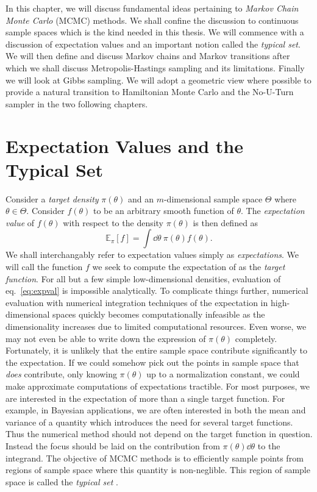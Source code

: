 In this chapter, we will discuss fundamental ideas pertaining to \textit{Markov Chain Monte Carlo} (MCMC) methods.
We shall confine the discussion to continuous sample spaces which is the kind needed in this thesis.
We will commence with a discussion of expectation values and an important notion called the \textit{typical set}. 
We will then define and discuss Markov chains and Markov transitions after which we shall
discuss Metropolis-Hastings sampling and its limitations. Finally we will
look at Gibbs sampling.
We will adopt a geometric view where possible to provide a natural transition to Hamiltonian Monte Carlo and the No-U-Turn sampler
in the two following chapters. 

\section{Expectation Values and the Typical Set}
Consider a \textit{target density} $\pi(\theta)$ and an $m$-dimensional sample space $\Theta$ where $\theta \in \Theta$. 
Consider $f(\theta)$ to be an arbitrary smooth
function of $\theta$. The \textit{expectation value} of $f(\theta)$ with respect to the density $\pi(\theta)$ is then defined as
\begin{equation}\label{eq:expval}
    \mathbb{E}_\pi[f] = \int \dd \theta \ \pi(\theta)f(\theta).
\end{equation}
We shall interchangably refer to expectation values simply as \textit{expectations}.
We will call the function $f$ we seek to compute the expectation of as the \textit{target function}.
For all but a few simple low-dimensional densities, evaluation of eq.~\eqref{eq:expval} is impossible analytically. 
To complicate things further, numerical evaluation with numerical integration techniques of the expectation in high-dimensional spaces quickly becomes computationally
infeasible as the dimensionality increases due to limited computational resources. 
Even worse, we may not even be able to write down the expression of $\pi(\theta)$ completely.
Fortunately, it is unlikely that the entire sample space contribute significantly to the expectation.
If we could somehow pick out the points in sample space that \textit{does} contribute, only knowing $\pi(\theta)$ up to a normalization constant, we could
make approximate computations of expectations tractible. 
For most purposes, we are interested in the expectation of more than a single target function. For example, in Bayesian applications,
we are often interested in both the mean and variance of a quantity which introduces the need for several target functions. 
Thus the numerical method should not depend on the target function in question. 
Instead the focus should be laid on the contribution from $\pi(\theta)\dd \theta$ to
the integrand. The objective of MCMC methods is to efficiently 
sample points from regions of sample space where this quantity is non-neglible. This region of sample space
is called the \textit{typical set} \cite{conceptual_intro_hmc}. 

